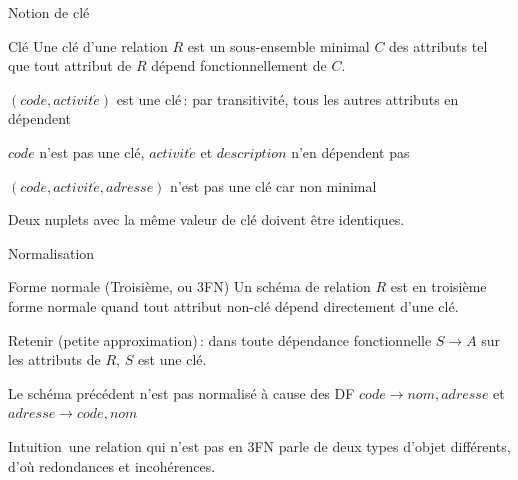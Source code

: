 \begin{frame}{Notion de clé}


\begin{defblock}{Clé}
Une clé d'une relation $R$ est un sous-ensemble \alert{minimal} $C$
des attributs tel que tout attribut de $R$ dépend fonctionnellement de $C$. 
\end{defblock}
\vfill

\begin{redbullet}
 \item $(code, activit\acute{e})$  est une clé\,: par transitivité, tous
 les autres attributs en dépendent
 \item $code$  n'est pas une clé, $activit\acute{e}$ et $description$ n'en dépendent pas
 \item $(code, activit\acute{e}, adresse)$  n'est pas une clé car non minimal
 
\end{redbullet}

\vfill

Deux nuplets avec la même valeur de clé doivent être identiques.
\end{frame}


\begin{frame}{Normalisation}
  
\begin{defblock}{Forme normale (Troisième, ou 3FN)}
  Un schéma de relation $R$ est en troisième forme normale quand
    tout attribut non-clé dépend directement d'une clé.
\end{defblock}
 
\vfill

\alert{Retenir} (petite approximation)\,: dans
   toute dépendance fonctionnelle $S \to A$ sur
   les attributs de $R$, $S$ est une clé. 

\vfill

Le schéma précédent n'est pas normalisé à cause des  DF
$code \to nom, adresse$ et $adresse \to code, nom$

\vfill

\alert{Intuition}\, une relation qui n'est pas en 3FN parle de deux
types d'objet différents, d'où redondances et incohérences.

\end{frame}


